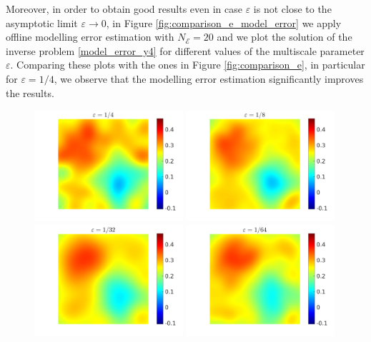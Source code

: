 \documentclass[10pt]{article}
\begin{document}
Moreover, in order to obtain good results even in case $\varepsilon$ is not close to the asymptotic limit $\varepsilon \to 0$, in Figure \ref{fig:comparison_e_model_error} we apply offline modelling error estimation with $N_{\mathcal{E}} = 20$ and we plot the solution of the inverse problem \eqref{model_error_y4} for different values of the multiscale parameter $\varepsilon$. Comparing these plots with the ones in Figure \ref{fig:comparison_e}, in particular for $\varepsilon = 1/4$, we observe that the modelling error estimation significantly improves the results.

\begin{figure}[t]
\centering
\includegraphics[width = 0.49\textwidth]{figures/ensemble_500_e4_model_error}
\includegraphics[width = 0.49\textwidth]{figures/ensemble_500_e8_model_error}
\\
\includegraphics[width = 0.49\textwidth]{figures/ensemble_500_e32_model_error}
\includegraphics[width = 0.49\textwidth]{figures/ensemble_500_e64_model_error}

\end{figure}
\end{document}
